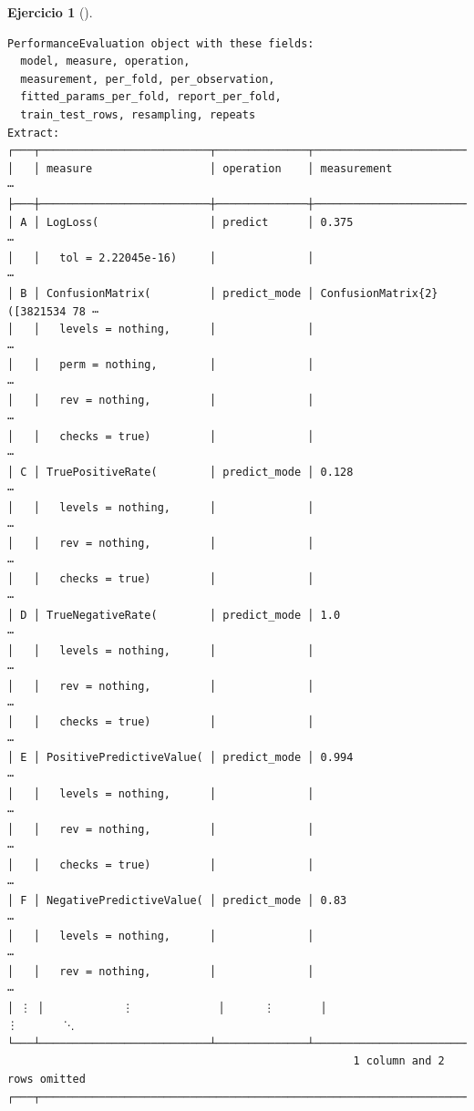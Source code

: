 \documentclass[
  a4paper,
]{scrreport}
\theoremstyle{definition}
\newtheorem{exercise}{Ejercicio}[chapter]
\theoremstyle{remark}
\begin{document}
\begin{exercise}[]
\begin{enumerate}
\begin{tcolorbox}
\begin{verbatim}
PerformanceEvaluation object with these fields:
  model, measure, operation,
  measurement, per_fold, per_observation,
  fitted_params_per_fold, report_per_fold,
  train_test_rows, resampling, repeats
Extract:
┌───┬──────────────────────────┬──────────────┬─────────────────────────────────
│   │ measure                  │ operation    │ measurement                    ⋯
├───┼──────────────────────────┼──────────────┼─────────────────────────────────
│ A │ LogLoss(                 │ predict      │ 0.375                          ⋯
│   │   tol = 2.22045e-16)     │              │                                ⋯
│ B │ ConfusionMatrix(         │ predict_mode │ ConfusionMatrix{2}([3821534 78 ⋯
│   │   levels = nothing,      │              │                                ⋯
│   │   perm = nothing,        │              │                                ⋯
│   │   rev = nothing,         │              │                                ⋯
│   │   checks = true)         │              │                                ⋯
│ C │ TruePositiveRate(        │ predict_mode │ 0.128                          ⋯
│   │   levels = nothing,      │              │                                ⋯
│   │   rev = nothing,         │              │                                ⋯
│   │   checks = true)         │              │                                ⋯
│ D │ TrueNegativeRate(        │ predict_mode │ 1.0                            ⋯
│   │   levels = nothing,      │              │                                ⋯
│   │   rev = nothing,         │              │                                ⋯
│   │   checks = true)         │              │                                ⋯
│ E │ PositivePredictiveValue( │ predict_mode │ 0.994                          ⋯
│   │   levels = nothing,      │              │                                ⋯
│   │   rev = nothing,         │              │                                ⋯
│   │   checks = true)         │              │                                ⋯
│ F │ NegativePredictiveValue( │ predict_mode │ 0.83                           ⋯
│   │   levels = nothing,      │              │                                ⋯
│   │   rev = nothing,         │              │                                ⋯
│ ⋮ │            ⋮             │      ⋮       │                        ⋮       ⋱
└───┴──────────────────────────┴──────────────┴─────────────────────────────────
                                                     1 column and 2 rows omitted
┌───┬───────────────────────────────────────────────────────────────────────────

\end{verbatim}
\end{tcolorbox}
\end{enumerate}
\end{exercise}
\end{document}
